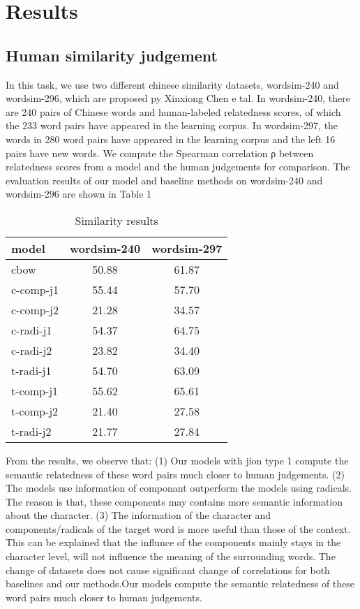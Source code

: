 \usepackage{amsmath}
\section{Results}
\subsection{Human similarity judgement} 
In this task, we use two different chinese similarity datasets, wordsim-240 and wordsim-296, which are proposed py Xinxiong Chen e tal. 
In wordsim-240, there are 240 pairs of Chinese words and human-labeled relatedness scores, of which the 233 word pairs have appeared in the learning corpus. In wordsim-297, the words in 280 word pairs have appeared in the learning corpus and the left 16 pairs have new words.
We compute the Spearman correlation ρ between relatedness scores from a model and the human judgements for comparison. The evaluation results of our model and baseline methods on wordsim-240 and wordsim-296 are shown in Table 1
\begin{table}[h]
\begin{center}
\begin{tabular}{lcc}
\hline \bf model & \bf wordsim-240 & \bf wordsim-297 \\ \hline
cbow & 50.88 & 61.87 \\
c-comp-j1\footnotemark[1] & 55.44 & 57.70\\
c-comp-j2 & 21.28 & 34.57 \\
c-radi-j1 & 54.37 & 64.75 \\
c-radi-j2 & 23.82  & 34.40\\
t-radi-j1  & 54.70 & 63.09\\
t-comp-j1  & 55.62 & 65.61\\
t-comp-j2 & 21.40 & 27.58\\
t-radi-j2 & 21.77 & 27.84\\
\hline
\end{tabular}
\end{center}
\caption{\label{font-table} Similarity results }
\end{table}
From the results, we observe that: (1) Our models with jion type 1 compute the semantic relatedness of these word pairs much closer to human judgements. (2) The models use information of componant outperform the models using radicals. The reason is that, these components may contains more semantic information about the character. (3) The information of the character and components/radicals of the target word is more useful than those of the context. This can be explained that the influnce of the components mainly stays in the character level, will not influence the meaning of the surrounding words. The change of datasets does not cause significant change of correlations for both baselines and our methods.Our models compute the semantic relatedness of these word pairs much closer to human judgements.

